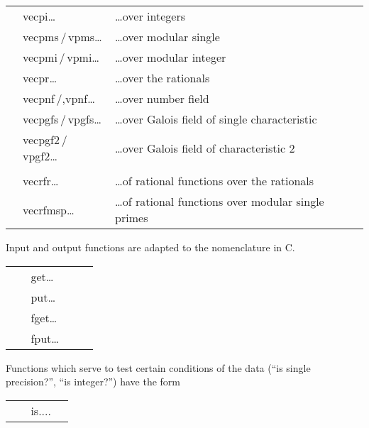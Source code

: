 \begin{tabular}{p{1.0in}p{1.3in}p{3.0in}}
                   & vecpi\ldots   & \ldots over integers\\
                   & vecpms\,/\,vpms\ldots & \ldots over modular single\\
                   & vecpmi\,/\,vpmi\ldots & \ldots over modular integer\\
                   & vecpr\ldots   & \ldots over the rationals\\
                   & vecpnf\,/,vpnf\ldots & \ldots over number field\\
                   & vecpgfs\,/\,vpgfs\ldots & \ldots over Galois field of single characteristic\\
                   & vecpgf2\,/\,vpgf2\ldots & \ldots over Galois field of characteristic 2\\
                   &               & \\
                   & vecrfr\ldots  & \ldots of rational functions over the rationals\\
                   & vecrfmsp\ldots & \ldots of rational functions over modular single primes\\
\end{tabular}
\leer
\leer
Input and output functions are adapted to the nomenclature in C.

\begin{tabular}{p{1.3in}p{1.0in}p{3.0in}}
      $_{~}$\                        & get\ldots & \\
                                     & put\ldots & \\
                                     & fget\ldots & \\
                                     & fput\ldots \ \ \ & 
\end{tabular}

\newpage

Functions which serve to test certain conditions of the data 
(``is single precision?'', ``is integer?'') have the form

\begin{tabular}{p{1.3in}p{1.0in}p{3.0in}}
$_{~}$\                     & is.... & 
\end{tabular}

\def\flu{\begin{flushleft}}
\def\ulf{\end{flushleft}}
\def\xxnewline{ }
\def\xxlinebreak{ }   
\def\rg{\raggedright}      

